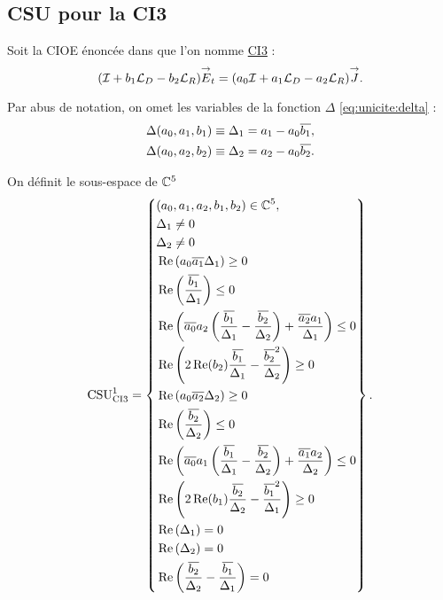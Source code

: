 \subsection{CSU pour la CI3}

  Soit la CIOE énoncée dans \cite{marceaux_high-order_2000} que l'on nomme \hyperlink{ci3}{CI3} :
  \begin{equation}
    \label{eq:unicite:ci3:ci3}
    ( \oI + b_1 \LD - b_2 \LR)\vE_t = (a_0\oI + a_1 \LD - a_2 \LR ) \vJ.
  \end{equation}

  Par abus de notation, on omet les variables de la fonction \(\Delta\) \eqref{eq:unicite:delta} :
  \begin{align*}
     \Delta(a_0,a_1,b_1) &\equiv \Delta_1 = a_1 - a_0\conj{b_1},
     \\
     \Delta(a_0,a_2,b_2) &\equiv \Delta_2 = a_2 - a_0\conj{b_2}.
  \end{align*}

  \begin{defn}
    \label{def:csu:ci3-1}

    On définit le sous-espace de \(\CC^5\)
    \begin{equation*}
      \CSU[1]{CI3} = \left\lbrace 
      \begin{aligned}
      &(a_0,a_1,a_2,b_1,b_2) \in \CC^5,
      \\
      &\Delta_1 \not = 0
      \\
      &\Delta_2 \not = 0
      \\
      &\Re\left(a_0\conj{a_1}\Delta_1\right) \ge 0
      \\
      &\Re\left(\frac{\conj{b_1}}{\Delta_1}\right) \le 0
      \\
      &\Re\left(\conj{a_0}a_2\left(\frac{\conj{b_1}}{\Delta_1}-\frac{\conj{b_2}}{\Delta_2}\right) + \frac{\conj{a_2}a_1}{\Delta_1} \right)\le 0
      \\
      &\Re\left(2\Re(b_2)\frac{\conj{b_1}}{\Delta_1}-\frac{\conj{b_2}^2}{\Delta_2}\right) \ge 0
      \\
      &\Re\left(a_0\conj{a_2}\Delta_2\right) \ge 0
      \\
      &\Re\left(\frac{\conj{b_2}}{\Delta_2}\right) \le 0
      \\
      &\Re\left(\conj{a_0}a_1\left(\frac{\conj{b_1}}{\Delta_1}-\frac{\conj{b_2}}{\Delta_2}\right) + \frac{\conj{a_1}a_2}{\Delta_2} \right)\le 0
      \\
      &\Re\left(2\Re(b_1)\frac{\conj{b_2}}{\Delta_2}-\frac{\conj{b_1}^2}{\Delta_1}\right) \ge 0
      \\
      &\Re\left(\Delta_1\right) = 0
      \\
      &\Re\left(\Delta_2\right) = 0
      \\
      &\Re\left(\frac{\conj{b_2}}{\Delta_2}-\frac{\conj{b_1}}{\Delta_1}\right) = 0
      \end{aligned}
      \right\rbrace.
    \end{equation*}
  \end{defn}
  

